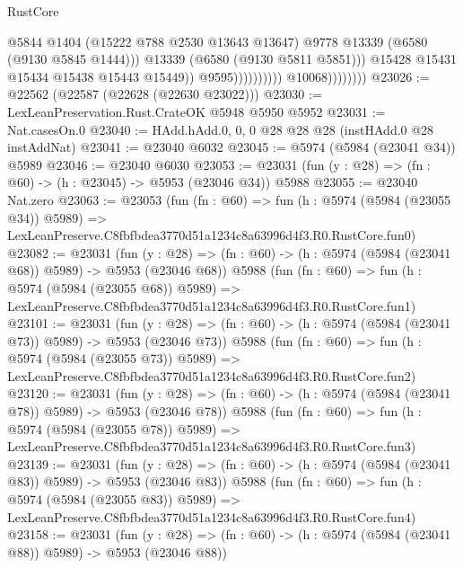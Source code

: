 \begin{lexlean}{RustCore}
\begin{coremodule}
                                                @5844
                                                @1404
                                                (@15222 @788 @2530 @13643 @13647)
                                                @9778
                                                @13339
                                                (@6580 (@9130 @5845 @1444)))
                                              @13339
                                              (@6580 (@9130 @5811 @5851)))
                                            @15428
                                            @15431
                                            @15434
                                            @15438
                                            @15443
                                            @15449))
                                        @9595))))))))))
                    @10068))))))))
@23026 := @22562 (@22587 (@22628 (@22630 @23022)))
@23030 := LexLeanPreservation.Rust.CrateOK @5948 @5950 @5952
@23031 := Nat.casesOn.{0}
@23040 := HAdd.hAdd.{0, 0, 0} @28 @28 @28 (instHAdd.{0} @28 instAddNat)
@23041 := @23040 @6032
@23045 := @5974 (@5984 (@23041 @34)) @5989
@23046 := @23040 @6030
@23053 := @23031 (fun (y : @28) => (fn : @60) -> (h : @23045) -> @5953 (@23046 @34)) @5988
@23055 := @23040 Nat.zero
@23063 := @23053
    (fun (fn : @60) =>
    fun (h : @5974 (@5984 (@23055 @34)) @5989) =>
    LexLeanPreserve.C8fbfbdea3770d51a1234c8a63996d4f3.R0.RustCore.fun0)
@23082 := @23031
    (fun (y : @28) => (fn : @60) -> (h : @5974 (@5984 (@23041 @68)) @5989) -> @5953 (@23046 @68))
    @5988
    (fun (fn : @60) =>
    fun (h : @5974 (@5984 (@23055 @68)) @5989) =>
    LexLeanPreserve.C8fbfbdea3770d51a1234c8a63996d4f3.R0.RustCore.fun1)
@23101 := @23031
    (fun (y : @28) => (fn : @60) -> (h : @5974 (@5984 (@23041 @73)) @5989) -> @5953 (@23046 @73))
    @5988
    (fun (fn : @60) =>
    fun (h : @5974 (@5984 (@23055 @73)) @5989) =>
    LexLeanPreserve.C8fbfbdea3770d51a1234c8a63996d4f3.R0.RustCore.fun2)
@23120 := @23031
    (fun (y : @28) => (fn : @60) -> (h : @5974 (@5984 (@23041 @78)) @5989) -> @5953 (@23046 @78))
    @5988
    (fun (fn : @60) =>
    fun (h : @5974 (@5984 (@23055 @78)) @5989) =>
    LexLeanPreserve.C8fbfbdea3770d51a1234c8a63996d4f3.R0.RustCore.fun3)
@23139 := @23031
    (fun (y : @28) => (fn : @60) -> (h : @5974 (@5984 (@23041 @83)) @5989) -> @5953 (@23046 @83))
    @5988
    (fun (fn : @60) =>
    fun (h : @5974 (@5984 (@23055 @83)) @5989) =>
    LexLeanPreserve.C8fbfbdea3770d51a1234c8a63996d4f3.R0.RustCore.fun4)
@23158 := @23031
    (fun (y : @28) => (fn : @60) -> (h : @5974 (@5984 (@23041 @88)) @5989) -> @5953 (@23046 @88))

\end{coremodule}
\end{lexlean}
